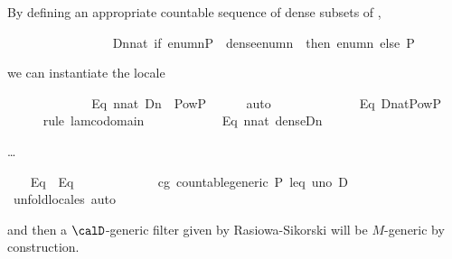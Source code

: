 \noindent By defining an appropriate countable sequence of dense subsets of ,
\begin{isabelle}

\ \ \isamarkupfalse%
\isanewline
\ \ \ \ \ \ \ \ \ \ \ \ \ \ {\isacharquery}D{\isacharequal}{\isachardoublequoteopen}{\isasymlambda}n{\isasymin}nat{\isachardot}\ {\isacharparenleft}if\ {\isacharparenleft}enum{\isacharbackquote}n{\isasymsubseteq}P\ {\isasymand}\ dense{\isacharparenleft}enum{\isacharbackquote}n{\isacharparenright}{\isacharparenright}\ \ then\ enum{\isacharbackquote}n\ else\ P{\isacharparenright}{\isachardoublequoteclose}
\end{isabelle}
\noindent we can instantiate the locale 

\begin{isabelle}

\ \ \isamarkupfalse%
\ \isanewline
\ \ \ \ \ \ \ \ \ Eq{}{\isacharcolon}\ {\isachardoublequoteopen}{\isasymforall}n{\isasymin}nat{\isachardot}\ {\isacharquery}D{\isacharbackquote}n\ {\isasymin}\ Pow{\isacharparenleft}P{\isacharparenright}{\isachardoublequoteclose}\isanewline
\ \ \ \ \isamarkupfalse%
\ auto\isanewline
\ \ \isamarkupfalse%
\ \isamarkupfalse%
\isanewline
\ \ \ \ \ \ \ \ \ Eq{}{\isacharcolon}\ {\isachardoublequoteopen}{\isacharquery}D{\isacharcolon}nat{\isasymrightarrow}Pow{\isacharparenleft}P{\isacharparenright}{\isachardoublequoteclose}\isanewline
\ \ \ \ \isamarkupfalse%
\ {\isacharparenleft}rule\ lam{\isacharunderscore}codomain{\isacharparenright}\isanewline
\ \ \isamarkupfalse%
\isanewline
\ \ \ \ \ \ \ \ \ Eq{}{\isacharcolon}\ {\isachardoublequoteopen}{\isasymforall}n{\isasymin}nat{\isachardot}\ dense{\isacharparenleft}{\isacharquery}D{\isacharbackquote}n{\isacharparenright}{\isachardoublequoteclose}
\end{isabelle}
\dots
\begin{isabelle}

\ \ \isamarkupfalse%
\ Eq{}\ \ Eq{}\ \isamarkupfalse%
\ \isanewline
\ \ \ \ \ \ \ \ \ \ cg{\isacharcolon}\ countable{\isacharunderscore}generic\ P\ leq\ uno\ {\isacharquery}D\ \isanewline
\ \ \ \ \isamarkupfalse%
\ {\isacharparenleft}unfold{\isacharunderscore}locales{\isacharcomma}\ auto{\isacharparenright}
\end{isabelle}
\noindent
and then a  $\calD$-generic filter given by Rasiowa-Sikorski will be $M$-generic by construction. 

